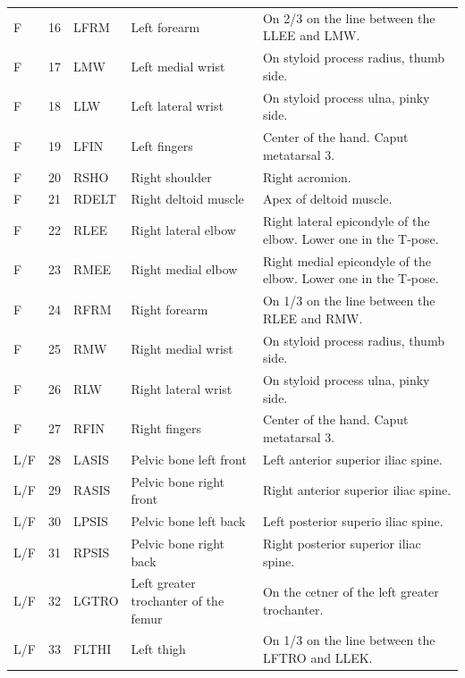 \documentclass[fleqn,10pt]{wlpeerj}
\begin{document}
\begin{table}
\begin{tabular}{lrlll}
    F   & 16 & LFRM  & Left forearm                          & On 2/3 on the line between the LLEE and LMW. \\
    F   & 17 & LMW   & Left medial wrist                     & On styloid process radius, thumb side. \\
    F   & 18 & LLW   & Left lateral wrist                    & On styloid process ulna, pinky side. \\
    F   & 19 & LFIN  & Left fingers                          & Center of the hand. Caput metatarsal 3. \\
    F   & 20 & RSHO  & Right shoulder                        & Right acromion. \\
    F   & 21 & RDELT & Right deltoid muscle                  & Apex of deltoid muscle. \\
    F   & 22 & RLEE  & Right lateral elbow                   & Right lateral epicondyle of the elbow. Lower one in the T-pose. \\
    F   & 23 & RMEE  & Right medial elbow                    & Right medial epicondyle of the elbow. Lower one in the T-pose. \\
    F   & 24 & RFRM  & Right forearm                         & On 1/3 on the line between the RLEE and RMW. \\
    F   & 25 & RMW   & Right medial wrist                    & On styloid process radius, thumb side. \\
    F   & 26 & RLW   & Right lateral wrist                   & On styloid process ulna, pinky side. \\
    F   & 27 & RFIN  & Right fingers                         & Center of the hand. Caput metatarsal 3. \\
    L/F & 28 & LASIS & Pelvic bone left front                & Left anterior superior iliac spine. \\
    L/F & 29 & RASIS & Pelvic bone right front               & Right anterior superior iliac spine. \\
    L/F & 30 & LPSIS & Pelvic bone left back                 & Left posterior superio iliac spine. \\
    L/F & 31 & RPSIS & Pelvic bone right back                & Right posterior superior iliac spine. \\
    L/F & 32 & LGTRO & Left greater trochanter of the femur  & On the cetner of the left greater trochanter. \\
    L/F & 33 & FLTHI & Left thigh                            & On 1/3 on the line between the LFTRO and LLEK. \\

\end{tabular}
\end{table}
\end{document}
